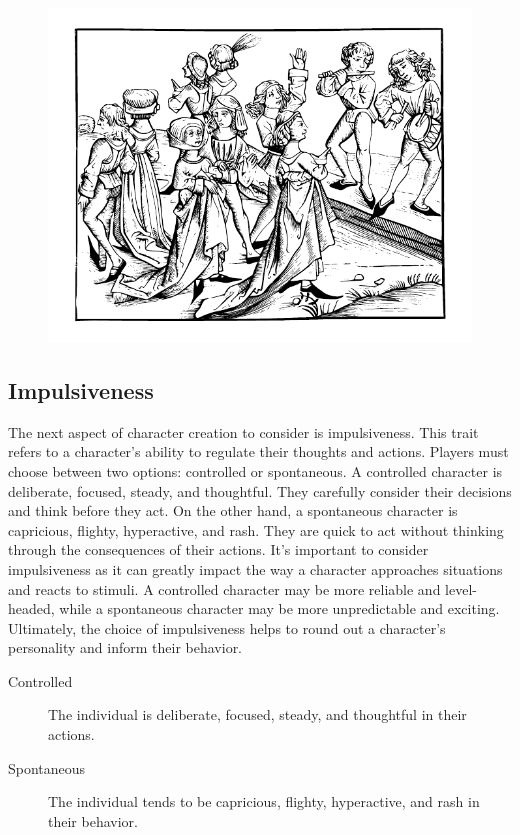 \documentclass[12pt]{book}  %
\begin{document}
\begin{figure}[h]
    \centering
    \includegraphics[width=\textwidth]{./images/personality04.pdf}
\end{figure}

\subsection{\textbf{Impulsiveness}}

The next aspect of character creation to consider is impulsiveness. This trait refers to a character's ability to regulate their thoughts and actions. Players must choose between two options: controlled or spontaneous. A controlled character is deliberate, focused, steady, and thoughtful. They carefully consider their decisions and think before they act. On the other hand, a spontaneous character is capricious, flighty, hyperactive, and rash. They are quick to act without thinking through the consequences of their actions. It's important to consider impulsiveness as it can greatly impact the way a character approaches situations and reacts to stimuli. A controlled character may be more reliable and level-headed, while a spontaneous character may be more unpredictable and exciting. Ultimately, the choice of impulsiveness helps to round out a character's personality and inform their behavior.

\begin{description}
    \item[Controlled] The individual is deliberate, focused, steady, and thoughtful in their actions.
    \item[Spontaneous] The individual tends to be capricious, flighty, hyperactive, and rash in their behavior.
\end{description}
\end{document}
